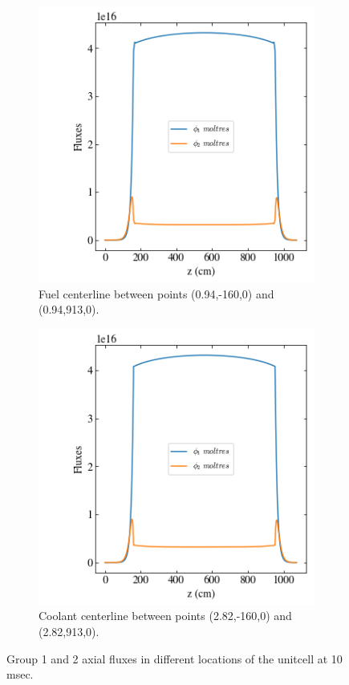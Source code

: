 \documentclass[11pt,letterpaper]{article}
\begin{document}
	\begin{figure}[htbp!]
		\centering
		\begin{subfigure}[t]{0.4\textwidth}
			\centering
			\includegraphics[width=\linewidth]{2D-unitcell-reflec-action1}
			\caption{Fuel centerline between points (0.94,-160,0) and (0.94,913,0).}
		\end{subfigure}
		\begin{subfigure}[t]{0.4\textwidth}
			\centering
			\includegraphics[width=\linewidth]{2D-unitcell-reflec-action2}
			\caption{Coolant centerline between points (2.82,-160,0) and (2.82,913,0).}
		\end{subfigure}
		\hfill
		\caption{Group 1 and 2 axial fluxes in different locations of the unitcell at 10 msec.}
		\label{fig:2D-unitcell-reflec1}
	\end{figure}
\end{document}
